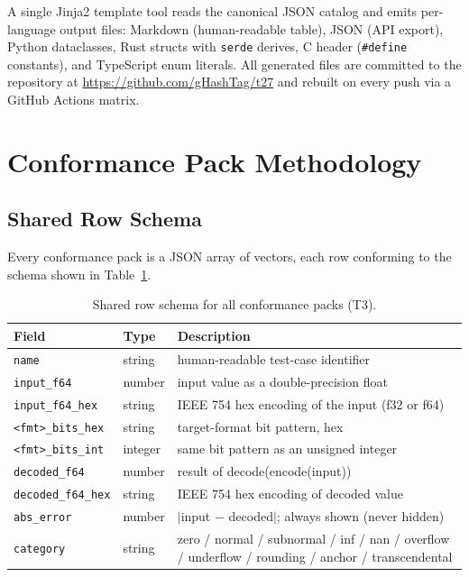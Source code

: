 \documentclass[11pt,letterpaper]{article}
\begin{document}
A single Jinja2 template tool reads the canonical JSON catalog and emits
per-language output files: Markdown (human-readable table), JSON (API export),
Python dataclasses, Rust structs with \texttt{serde} derives, C header
(\texttt{\#define} constants), and TypeScript enum literals.  All generated
files are committed to the repository at \url{https://github.com/gHashTag/t27}
and rebuilt on every push via a GitHub Actions matrix.

\section{Conformance Pack Methodology}
\label{sec:methodology}

\subsection{Shared Row Schema}

Every conformance pack is a JSON array of vectors, each row conforming to the
schema shown in Table~\ref{tab:schema}.

\begin{table}[ht]
\centering
\small
\caption{Shared row schema for all conformance packs (T3).}
\label{tab:schema}
\begin{tabularx}{\linewidth}{l l X}
\toprule
\textbf{Field} & \textbf{Type} & \textbf{Description} \\
\midrule
\texttt{name}              & string  & human-readable test-case identifier \\
\texttt{input\_f64}        & number  & input value as a double-precision float \\
\texttt{input\_f64\_hex}   & string  & IEEE 754 hex encoding of the input (f32 or f64) \\
\texttt{<fmt>\_bits\_hex}  & string  & target-format bit pattern, hex \\
\texttt{<fmt>\_bits\_int}  & integer & same bit pattern as an unsigned integer \\
\texttt{decoded\_f64}      & number  & result of decode(encode(input)) \\
\texttt{decoded\_f64\_hex} & string  & IEEE 754 hex encoding of decoded value \\
\texttt{abs\_error}        & number  & $|$input $-$ decoded$|$; always shown (never hidden) \\
\texttt{category}          & string  & zero / normal / subnormal / inf / nan / overflow / underflow / rounding / anchor / transcendental \\
\bottomrule
\end{tabularx}
\end{table}
\end{document}
